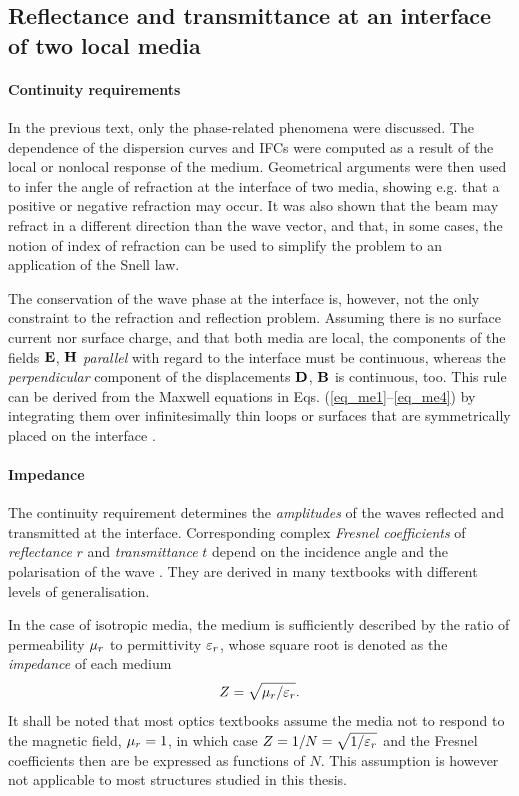 \subsection{Reflectance and transmittance at an interface of two local media}
\paragraph{Continuity requirements} %
In the previous text, only the phase-related phenomena were discussed. The dependence of the dispersion curves and IFCs were computed as a result of the local or nonlocal response of the medium. Geometrical arguments were then used to infer the angle of refraction at the interface of two media, showing e.g. that a positive or negative refraction may occur. It was also shown that the beam may refract in a different direction than the wave vector, and that, in some cases, the notion of index of refraction can be used to simplify the problem to an application of the Snell law.

The conservation of the wave phase at the interface is, however, not the only constraint to the refraction and reflection problem. Assuming there is no surface current nor surface charge, and that both media are local, the components of the fields $\mathbf{E}$, $\mathbf{H}$ \textit{parallel} with regard to the interface must be continuous, whereas the \textit{perpendicular} component of the displacements $\mathbf{D}$, $\mathbf{B}$ is continuous, too. This rule can be derived from the Maxwell equations in Eqs. (\ref{eq_me1}--\ref{eq_me4}) by integrating them over infinitesimally thin loops or surfaces that are symmetrically placed on the interface \cite[pp. 26-29]{klingshirn2007semiconductor}. 

\paragraph{Impedance} %
The continuity requirement determines the \textit{amplitudes} of the waves reflected and transmitted at the interface. Corresponding complex \textit{Fresnel coefficients} of \textit{reflectance} $r$ and \textit{transmittance} $t$ depend on the incidence angle and the polarisation of the wave \cite[p. 38]{born1999book}. They are derived in many textbooks with different levels of generalisation. 

In the case of isotropic media, the medium is sufficiently described by the ratio of permeability $\mu_r$ to permittivity $\varepsilon_r$, whose square root is denoted as the \textit{impedance} of each medium 
\begin{equation} Z = \sqrt{\mu_r/\varepsilon_r}. \label{eq_Z}\end{equation}
It shall be noted that most optics textbooks assume the media not to respond to the magnetic field, $\mu_r=1$, in which case $Z = 1/N = \sqrt{1/\varepsilon_r}$ and the Fresnel coefficients then are be expressed as functions of $N$. This assumption is however not applicable to most structures studied in this thesis.

